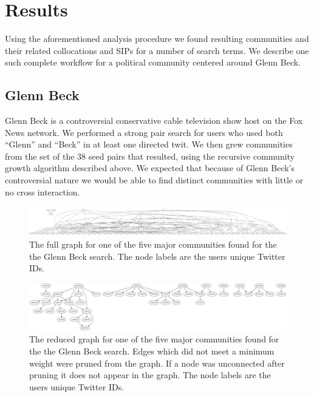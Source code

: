 \section{Results}
Using the aforementioned analysis procedure we found resulting communities and their related collocations and SIPs for a number of search terms.  We describe one such complete workflow for a political community centered around Glenn Beck.

\subsection{Glenn Beck}
Glenn Beck is a controversial conservative cable television show host on the Fox News network.  We performed a strong pair search for users who used both ``Glenn'' and ``Beck'' in at least one directed twit.  We then grew communities from the set of the 38 seed pairs that resulted, using the recursive community growth algorithm described above.  We expected that because of Glenn Beck's controversial nature we would be able to find distinct communities with little or no cross interaction.

\begin{figure}
  \begin{center}
  \includegraphics[width=6in]{figures/gb5.pdf}
  \end{center}
  \caption{The full graph for one of the five major communities found for the the Glenn Beck search.  The node labels are the users unique Twitter IDs.}
  \label{figure:gb-full}
\end{figure}

\begin{figure}
  \begin{center}
  \includegraphics[width=6in]{figures/gb5-reduced.pdf}
  \end{center}
  \caption{The reduced graph for one of the five major communities found for the the Glenn Beck search.  Edges which did not meet a minimum weight were pruned from the graph.  If a node was unconnected after pruning it does not appear in the graph.  The node labels are the users unique Twitter IDs.}
  \label{figure:gb-reduced}
\end{figure}


